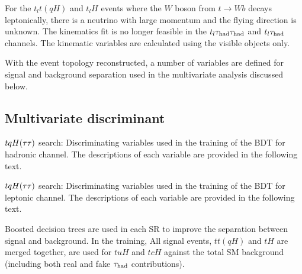 For the  $t_lt(qH)$ and $t_lH$ events where the $W$ boson from $t\to W b$ decays leptonically, there is a neutrino with large momentum and the flying direction is unknown. The kinematics fit is no longer feasible in the $t_l\tau_{\mathrm{had}} \tau_{\mathrm{had}}$ and $t_l\tau_{\mathrm{had}}$ channels. The kinematic variables are calculated using the visible
objects only.

With the event topology reconstructed, a number of variables are defined for signal and background separation used in the multivariate analysis discussed below.


\subsection{Multivariate discriminant}

\begin{table}[t!]
\caption{\small{$tqH(\tau\tau)$ search: Discriminating variables used in the training of the BDT for hadronic channel. 
    The descriptions of each variable are provided in the following text.}}
\label{tab:importance_xTFW}

\end{table}

\begin{table}[t!]
\caption{\small{$tqH(\tau\tau)$ search: Discriminating variables used in the training of the BDT for leptonic channel. 
    The descriptions of each variable are provided in the following text.}}
\label{tab:importance_tthML}

\end{table}

Boosted decision trees are used in each SR to improve the separation between signal and background. 
In the training, All signal events, $tt(qH)$ and $tH$ are merged together, are used for $tuH$ and $tcH$ against the total SM background (including both real and fake $\tau_{\mathrm{had}}$ contributions).

